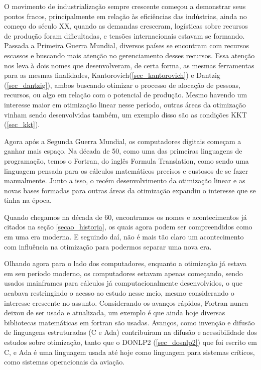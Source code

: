 O movimento de industrialização sempre crescente começou a demonstrar seus pontos fracos,
principalmente em relação às eficiências das indústrias, ainda no começo do século XX,
quando as demandas cresceram, logísticas sobre recursos de produção foram dificultadas,
e tensões internacionais estavam se formando. Passada a Primeira Guerra Mundial, diversos
países se encontram com recursos escassos e buscando mais atenção no gerenciamento desses
recursos. Essa atenção nos leva à dois nomes que desenvolveram, de certa forma, as mesmas
ferramentas para as mesmas finalidades, Kantorovich(\ref{sec_kantorovich}) e Dantzig
(\ref{sec_dantzig}), ambos buscando otimizar o processo de alocação de pessoas, recursos,
ou algo em relação com o potencial de produção. Mesmo havendo um interesse maior em
otimização linear nesse período, outras áreas da otimização vinham sendo desenvolvidas
também, um exemplo disso são as condições KKT (\ref{sec_kkt}).

Agora após a Segunda Guerra Mundial, os computadores digitais começam a ganhar mais espaço.
Na década de 50, como uma das primeiras linguagens de programação, temos o Fortran, do
inglês Formula Translation, como sendo uma linguagem pensada para os cálculos matemáticos
precisos e custosos de se fazer manualmente. Junto a isso, o recém desenvolvimento da otimização
linear e as novas bases formadas para outras áreas da otimização expandiu o interesse que
se tinha na época.

Quando chegamos na década de 60, encontramos os nomes e acontecimentos já citados na seção
\ref{secao_historia}, os quais agora podem ser compreendidos como em uma era moderna. E
seguindo daí, não é mais tão claro um acontecimento com influência na otimização para
podermos separar uma nova era.

Olhando agora para o lado dos computadores, enquanto a otimização já estava em seu
período moderno, os computadores estavam apenas começando, sendo usados mainframes
para cálculos já computacionalmente desenvolvidos, o que acabava restringindo o
acesso ao estudo nesse meio, mesmo considerando o interesse crescente no assunto.
Considerando os avanços rápidos, Fortran nunca deixou de ser usada e atualizada,
um exemplo é que ainda hoje diversas bibliotecas matemáticas em fortran são usadas.
Avanços, como invenção e difusão de linguagens estruturadas (C e Ada) contribuíram
na difusão e acessibilidade dos estudos sobre otimização, tanto que o DONLP2
(\ref{sec_dosnlp2}) que foi escrito em C, e Ada é uma linguagem usada até hoje
como linguagem para sistemas críticos, como sistemas operacionais da aviação.

